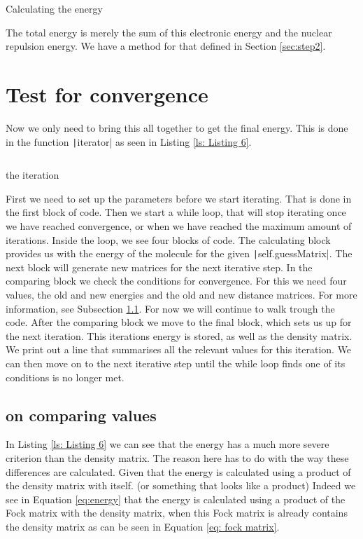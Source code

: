 \documentclass[%
    paper=A4,               %
    twoside=true,           %
    openany,              %
    parskip=full,           %
    chapterprefix=true,     %
    11pt,                   %
    headings=normal,        %
    bibliography=totoc,     %
    listof=totoc,           %
    titlepage=on,           %
    captions=tableabove,    %
    draft=false,            %
]{scrreprt}
\numberwithin{equation}{section}
\begin{document}
     \begin{listing}[ht]
         \centering
        \inputminted[firstline=127, lastline=132, autogobble]{python}{Hartree_FockL.py}
        \caption{Calculating the energy}
        \label{ls: Listing 5}
     \end{listing}
     The total energy is merely the sum of this electronic energy and the nuclear repulsion energy. We have a method for that defined in Section \ref{sec:step2}.
     
     \section{Test for convergence}
     \label{sec:step6}
    Now we only need to bring this all together to get the final energy. This is done in the function \texttt|iterator| as seen in Listing \ref{ls: Listing 6}.
    
     \begin{listing}[H]
         \centering
        \inputminted[firstline=142, lastline=178, autogobble]{python}{Hartree_FockL.py}
        \caption{the iteration}
        \label{ls: Listing 6}
     \end{listing}
     First we need to set up the parameters before we start iterating. That is done in the first block of code. Then we start a while loop, that will stop iterating once we have reached convergence, or when we have reached the maximum amount of iterations. Inside the loop, we see four blocks of code. The calculating block provides us with the energy of the molecule for the given \texttt|self.guessMatrix|. The next block will generate new matrices for the next iterative step. In the comparing block we check the conditions for convergence. For this we need four values, the old and new energies and the old and new distance matrices. For more information, see Subsection \ref{subsec:step6.1}. For now we will continue to walk trough the code. After the comparing block we move to the final block, which sets us up for the next iteration. This iterations energy is stored, as well as the density matrix. We print out a line that summarises all the relevant values for this iteration. We can then move on to the next iterative step until the while loop finds one of its conditions is no longer met.
     
     \subsection{on comparing values}
     \label{subsec:step6.1}
     In Listing \ref{ls: Listing 6} we can see that the energy has a much more severe criterion than the density matrix. The reason here has to do with the way these differences are calculated. Given that the energy is calculated using a product of the density matrix with itself. (or something that looks like a product) Indeed we see in Equation \ref{eq:energy} that the energy is calculated using a product of the Fock matrix with the density matrix, when this Fock matrix is already contains the density matrix as can be seen in Equation \ref{eq: fock matrix}. 
     
\end{document}

